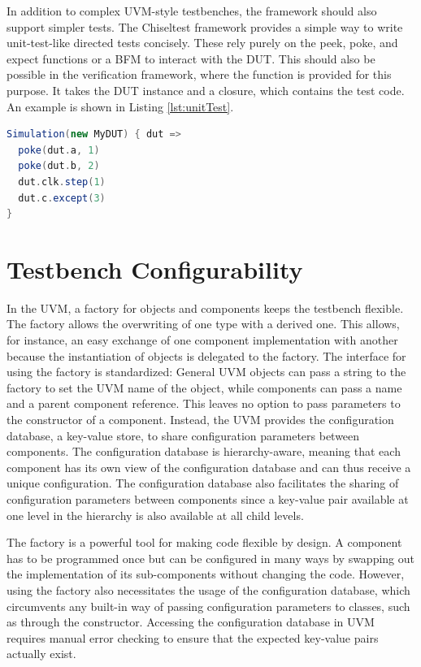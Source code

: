In addition to complex UVM-style testbenches, the framework should also support simpler tests. The Chiseltest
framework provides a simple way to write unit-test-like directed tests concisely. These rely purely on the
peek, poke, and expect functions or a BFM to interact with the DUT. This should also be possible in the verification
framework, where the  function is provided for this purpose. It takes the DUT instance and a closure, which
contains the test code. An example is shown in Listing \ref{lst:unitTest}.

\begin{listing}
\begin{lstlisting}[language=scala, captionpos=b, caption=Example code for running a test case using the verification framework.,label=lst:unitTest]
Simulation(new MyDUT) { dut =>
  poke(dut.a, 1)
  poke(dut.b, 2)
  dut.clk.step(1)
  dut.c.except(3)
}
\end{lstlisting}
\end{listing}

\section{Testbench Configurability} %

In the UVM, a factory for objects and components keeps the testbench flexible. The factory allows the
overwriting of one type with a derived one. This allows, for instance, an easy exchange of one component implementation with
another because the instantiation of objects is delegated to the factory. The interface for using the factory is
standardized: General UVM objects can pass a string to the factory to set the UVM name of the object, while components can pass a
name and a parent component reference. This leaves no option to pass parameters to the constructor of a component.
Instead, the UVM provides the configuration database, a key-value store, to share configuration parameters between
components. The configuration database is hierarchy-aware, meaning that each component has its own view of the
configuration database and can thus receive a unique configuration. The configuration database also facilitates the
sharing of configuration parameters between components since a key-value pair available at one level in the
hierarchy is also available at all child levels.

The factory is a powerful tool for making code flexible by design. A component has to be programmed once but can be
configured in many ways by swapping out the implementation of its sub-components without changing the code. However, using the factory also necessitates the usage of the configuration database, which circumvents any built-in way of
passing configuration parameters to classes, such as through the constructor. Accessing the configuration database in UVM
requires manual error checking to ensure that the expected key-value pairs actually exist.

